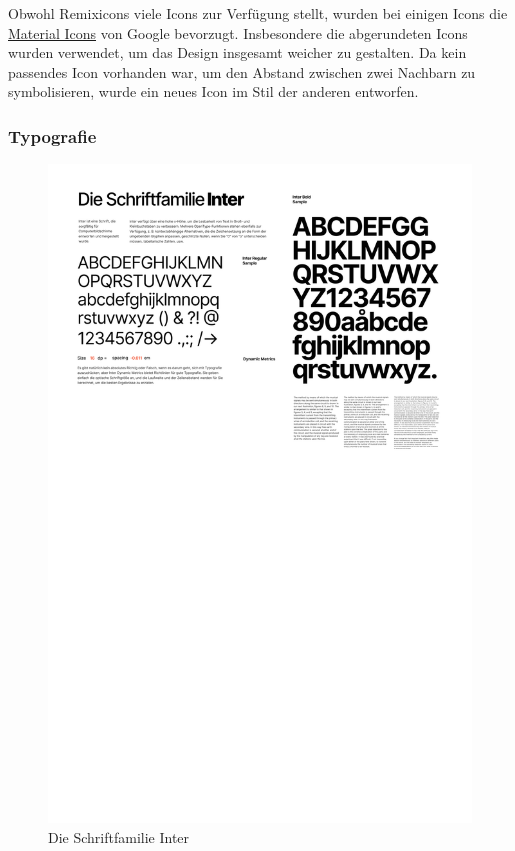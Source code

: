 Obwohl Remixicons viele Icons zur Verfügung stellt, wurden
bei einigen Icons die
\href{https://fonts.google.com/icons?icon.set=Material+Icons}{Material Icons}
von Google bevorzugt.
Insbesondere die abgerundeten Icons wurden verwendet, um das
Design insgesamt weicher zu gestalten. Da kein passendes
Icon vorhanden war, um den Abstand zwischen zwei Nachbarn zu
symbolisieren, wurde ein neues Icon im Stil der anderen
entworfen.

\subsubsection{Typografie}
\begin{figure}[H]
  \centering
  \includegraphics[width=1\textwidth]{pics/font.png}
  \caption{Die Schriftfamilie Inter}
  \label{fig:font}
\end{figure}

